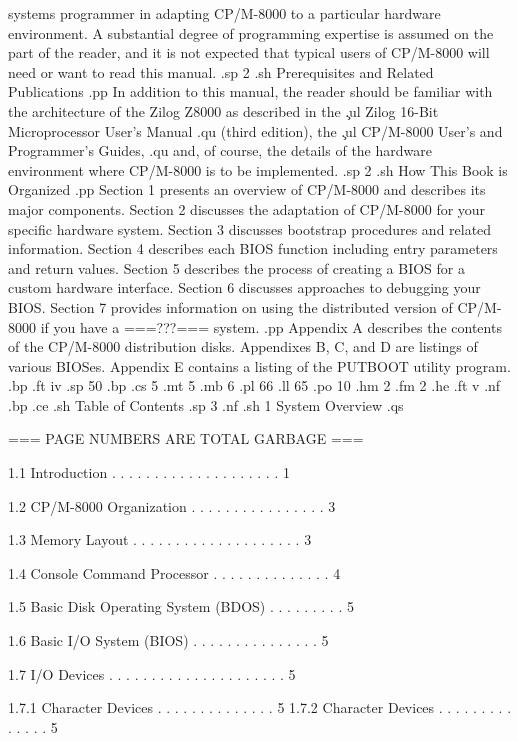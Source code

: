 systems programmer in adapting CP/M-8000 to a particular hardware
environment.   A substantial degree of programming expertise is
assumed on the part of the reader, and it is not expected that
typical users of CP/M-8000 will need or want to read this manual.
.sp 2
.sh
Prerequisites and Related Publications
.pp
In addition to this manual, the reader should be familiar with the
architecture of the Zilog Z8000 as described in the \c
.ul
Zilog 16-Bit Microprocessor User's Manual
.qu
(third edition), the \c
.ul
CP/M-8000 User's and Programmer's Guides,
.qu
and, of course, the details of the hardware environment where CP/M-8000 is 
to be implemented.
.sp 2
.sh
How This Book is Organized
.pp
Section 1 presents an overview of CP/M-8000 and describes its major 
components.  Section 2 discusses the adaptation of CP/M-8000 for your specific 
hardware system.  Section 3 discusses bootstrap procedures and related 
information.  Section 4 describes each BIOS function including entry 
parameters and return values.  Section 5 describes the process of creating a 
BIOS for a custom hardware interface.  Section 6 discusses approaches to 
debugging your BIOS.  Section 7 provides information on using the distributed 
version of CP/M-8000 if you have a ===???===   system.
.pp
Appendix A describes the contents of the CP/M-8000 distribution disks. 
Appendixes B, C, and D are listings of various BIOSes.  Appendix E 
contains a listing of the PUTBOOT utility program.  
.bp
.ft                                 iv
.sp 50
.bp
.cs 5
.mt 5
.mb 6
.pl 66
.ll 65
.po 10
.hm 2
.fm 2
.he 
.ft                                  v 
.nf
.bp
.ce
.sh
Table of Contents
.sp 3
.nf
.sh
1  System Overview  
.qs

		=== PAGE NUMBERS ARE TOTAL GARBAGE ===

   1.1  Introduction  . . . . . . . . . . . . . . . . . . . .   1 

   1.2  CP/M-8000 Organization . . . . . . . . . . . . . . . .   3 

   1.3  Memory Layout . . . . . . . . . . . . . . . . . . . .   3 

   1.4  Console Command Processor . . . . . . . . . . . . . .   4 

   1.5  Basic Disk Operating System (BDOS)  . . . . . . . . .   5 

   1.6  Basic I/O System (BIOS) . . . . . . . . . . . . . . .   5 

   1.7  I/O Devices . . . . . . . . . . . . . . . . . . . . .   5 

        1.7.1  Character Devices  . . . . . . . . . . . . . .   5 
        1.7.2  Character Devices  . . . . . . . . . . . . . .   5 

